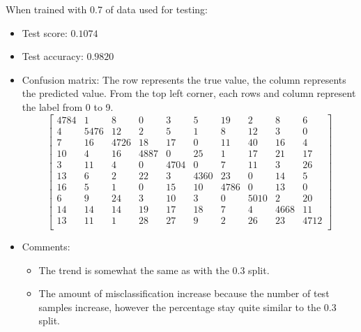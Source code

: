 \documentclass[paper=a4, fontsize=11pt]{scrartcl} %
\begin{document}
    When trained with 0.7 of data used for testing:
    \begin{itemize}
        \item Test score: $0.1074$
        \item Test accuracy: $0.9820$
        \item Confusion matrix: The row represents the true value, the column represents the predicted value. From the top left corner, each rows and column represent the label from 0 to 9.
        \[ \left[ \begin{array}{cccccccccc}
        4784 &    1 &    8 &    0 &    3 &    5 &   19 &    2 &    8 &    6 \\
           4 & 5476 &   12 &    2 &    5 &    1 &    8 &   12 &    3 &    0 \\
           7 &   16 & 4726 &   18 &   17 &    0 &   11 &   40 &   16 &    4 \\
          10 &    4 &   16 & 4887 &    0 &   25 &    1 &   17 &   21 &   17 \\
           3 &   11 &    4 &    0 & 4704 &    0 &    7 &   11 &    3 &   26 \\
          13 &    6 &    2 &   22 &    3 & 4360 &   23 &    0 &   14 &    5 \\
          16 &    5 &    1 &    0 &   15 &   10 & 4786 &    0 &   13 &    0 \\
           6 &    9 &   24 &    3 &   10 &    3 &    0 & 5010 &    2 &   20 \\
          14 &   14 &   14 &   19 &   17 &   18 &    7 &    4 & 4668 &   11 \\
          13 &   11 &    1 &   28 &   27 &    9 &    2 &   26 &   23 & 4712 \\
        \end{array} \right] \]
        \item Comments:
        \begin{itemize}
            \item The trend is somewhat the same as with the 0.3 split.
            \item The amount of misclassification increase because the number of test samples increase, however the percentage stay quite similar to the 0.3 split.
        \end{itemize}
    \end{itemize}
\end{document}

